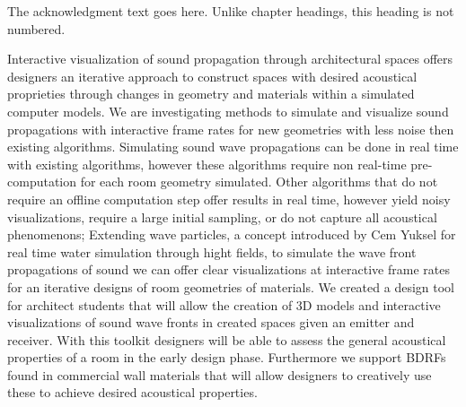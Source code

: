 \documentclass{thesis}
\author{Max Espinoza}
\begin{document}
 

\titlepage             %


\tableofcontents       %

\listoftables          %

\listoffigures         %



The acknowledgment text goes here. Unlike chapter headings, 
this heading is not numbered.



Interactive visualization of sound propagation through architectural spaces 
offers designers an iterative approach to construct spaces with desired
acoustical proprieties through changes in geometry and materials within a 
simulated computer models.
We are investigating methods to simulate and visualize sound propagations with 
interactive frame rates for new geometries with less noise then existing 
algorithms.
Simulating sound wave propagations can be done in real time with existing 
algorithms, however these algorithms require non real-time pre-computation for 
each room geometry simulated.
Other algorithms that do not require an offline computation step offer results
in real time, however yield noisy visualizations, require a large initial
sampling, or do not capture all acoustical phenomenons;
Extending wave particles, a concept introduced by Cem Yuksel for real time 
water simulation through hight fields, to simulate the wave front propagations 
of sound we can offer clear visualizations at interactive frame rates for an
iterative designs of room geometries of materials.
We created a design tool for architect students that will allow the 
creation of 3D models and interactive visualizations of sound wave fronts in
created spaces given an emitter and receiver. 
With this toolkit designers will be able to assess the general acoustical
properties of a room in the early design phase. Furthermore we support BDRFs 
found in commercial wall materials that will allow designers to creatively use
these to achieve desired acoustical properties.
\end{document}
